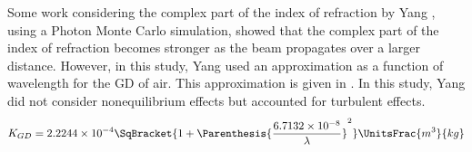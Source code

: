     Some work considering the complex part of the index of refraction
 by Yang \cite{Yang2023}, using a Photon
Monte Carlo simulation, showed that the complex part of the index of
refraction becomes stronger as the beam propagates over a larger distance.
However, in this study, Yang used an approximation as a function of
wavelength for the \gls{GD} of air. This approximation is
given in . In this study, Yang did
not consider nonequilibrium effects but accounted for turbulent effects.
    \begin{equation}\label{eq:yangGladstoneDaleApproximation}
        K_{GD} = 2.2244 \times 10^{-4} \SqBracket{1 + \Parenthesis{\frac{6.7132
        \times 10^{-8}}{\lambda} }^2}
        \UnitsFrac{m^3}{kg}
    \end{equation}
